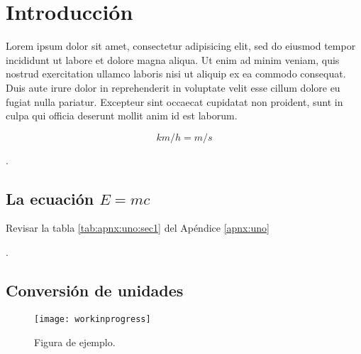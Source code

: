 \chapter{Introducción}
Lorem ipsum dolor sit amet, consectetur adipisicing elit, sed do eiusmod tempor incididunt ut labore et dolore magna aliqua. Ut enim ad minim veniam, quis nostrud exercitation ullamco laboris nisi ut aliquip ex ea commodo consequat. Duis aute irure dolor in reprehenderit in voluptate velit esse cillum dolore eu fugiat nulla pariatur. Excepteur sint occaecat cupidatat non proident, sunt in culpa qui officia deserunt mollit anim id est laborum\citep{ejemplo01}.


\begin{equation*}
  \si{km\per h = m\per s}
\end{equation*}

\lipsum[2]\cite{ejemplo02}.

\section{La ecuación \texorpdfstring{$E=mc$}{E=mc}}
\lipsum[3]

\lipsum[4] Revisar la tabla \ref{tab:apnx:uno:sec1} del Apéndice \ref{apnx:uno}

\lipsum[5-6]\citep{Dan,Baz}.

\section{Conversión de unidades}%
\lipsum[7]

\begin{figure}[!h]
  \center
  \texttt{[image: workinprogress]}
  \caption{Figura de ejemplo.}
  \label{fig:ejemplo1}
\end{figure}

\lipsum[8-9]

